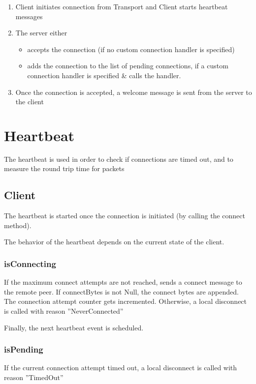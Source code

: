 \begin{enumerate}
	\item Client initiates connection from Transport and Client starts heartbeat messages
	\item The server either
	\begin{itemize}
		\item accepts the connection (if no custom connection handler is specified)
		\item adds the connection to the list of pending connections, if a custom connection handler is specified \& calls the handler.
	\end{itemize}
	\item Once the connection is accepted, a welcome message is sent from the server to the client
\end{enumerate}

\section{Heartbeat}

The heartbeat is used in order to check if connections are timed out, and to measure the round trip time for packets

\subsection{Client}

The heartbeat is started once the connection is initiated (by calling the connect method).

The behavior of the heartbeat depends on the current state of the client.

\subsubsection{isConnecting}

If the maximum connect attempts are not reached, sends a connect message to the remote peer. If connectBytes is not Null, the connect bytes are appended. The connection attempt counter gets incremented. Otherwise, a local disconnect is called with reason ''NeverConnected''

Finally, the next heartbeat event is scheduled.

\subsubsection{isPending}

If the current connection attempt timed out, a local disconnect is called with reason ''TimedOut''

